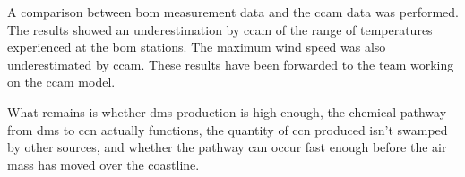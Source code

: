 A comparison between \gls{bom} measurement data and the \gls{ccam} data was performed. The results showed an underestimation by \gls{ccam} of the range of temperatures experienced at the \gls{bom} stations. The maximum wind speed was also underestimated by \gls{ccam}. These results have been forwarded to the team working on the \gls{ccam} model.

What remains is whether \gls{dms} production is high enough, the chemical pathway from \gls{dms} to \gls{ccn} actually functions, the quantity of \gls{ccn} produced isn't swamped by other sources, and whether the pathway can occur fast enough before the air mass has moved over the coastline.